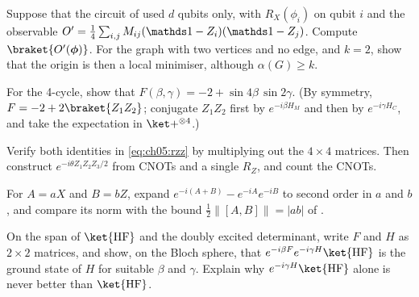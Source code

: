 \documentclass[handoutsbeamer.tex]{subfiles}
\begin{document}
\begin{frame}
\onp{\footnotesize}
\begin{exe}\label{exe:ch05:twoqubits}
Suppose that the circuit of  used $d$ qubits only, with $R_X(\phi_i)$ on qubit $i$ and the observable $O' = \frac14\sum_{i,j}M_{ij}(\one-Z_i)(\one-Z_j)$. Compute $\braket{O'(\boldsymbol\phi)}$. For the graph with two vertices and no edge, and $k = 2$, show that the origin is then a local minimiser, although $\alpha(G)\ge k$.
\end{exe}
\begin{exe}\label{exe:ch05:c4}
For the 4-cycle, show that $F(\beta,\gamma) = -2 + \sin4\beta\,\sin2\gamma$. (By symmetry, $F = -2 + 2\braket{Z_1Z_2}$; conjugate $Z_1Z_2$ first by $e^{-i\beta H_M}$ and then by $e^{-i\gamma H_C}$, and take the expectation in $\ket+^{\otimes4}$.)
\end{exe}
\begin{exe}\label{exe:ch05:rzz}
Verify both identities in \eqref{eq:ch05:rzz} by multiplying out the $4\times4$ matrices. Then construct $e^{-i\theta Z_1Z_2Z_3/2}$ from CNOTs and a single $R_Z$, and count the CNOTs.
\end{exe}
\end{frame}

\begin{frame}
\onp{\footnotesize}
\begin{exe}
For $A = aX$ and $B = bZ$, expand $e^{-i(A+B)} - e^{-iA}e^{-iB}$ to second order in $a$ and $b$, and compare its norm with the bound $\frac12\|[A,B]\| = |ab|$ of .
\end{exe}
\begin{exe}
On the span of $\ket{\rm HF}$ and the doubly excited determinant, write $F$ and $H$ as $2\times2$ matrices, and show, on the Bloch sphere, that $e^{-i\beta F}e^{-i\gamma H}\ket{\rm HF}$ is the ground state of $H$ for suitable $\beta$ and $\gamma$. Explain why $e^{-i\gamma H}\ket{\rm HF}$ alone is never better than $\ket{\rm HF}$.
\end{exe}
\end{frame}

\begin{frame}[allowframebreaks]
\biblio
\end{frame}
\end{document}
